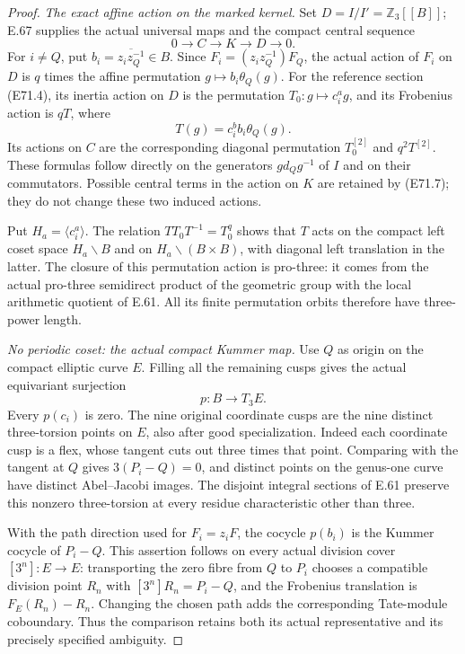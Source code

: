\begin{proof}
\emph{The exact affine action on the marked kernel.}
Set $D=I/I'=\mathbb Z_3[[B]]$; E.67 supplies the actual
universal maps and the compact central sequence
\[
                  0\longrightarrow C\longrightarrow K
                         \longrightarrow D\longrightarrow0.
 \tag{E71.7}
\]
For $i\ne Q$, put
$b_i=\overline{z_i z_Q^{-1}}\in B$.
Since $F_i=(z_i z_Q^{-1})F_Q$, the actual action of
$F_i$ on $D$ is $q$ times the affine permutation
$g\mapsto b_i\theta_Q(g)$.
For the reference section (E71.4), its inertia action
on $D$ is the permutation $T_0:g\mapsto c_i^a g$, and
its Frobenius action is $qT$, where
\[
               T(g)=c_i^b b_i\theta_Q(g).
 \tag{E71.8}
\]
Its actions on $C$ are the corresponding diagonal
permutation $T_0^{[2]}$ and $q^2T^{[2]}$.
These formulas follow directly on the generators
$g d_Qg^{-1}$ of $I$ and on their commutators.
Possible central terms in the action on $K$ are
retained by (E71.7); they do not change these two
induced actions.

Put $H_a=\langle c_i^a\rangle$. The relation
$T T_0T^{-1}=T_0^q$ shows that $T$ acts on the compact
left coset space $H_a\backslash B$ and on
$H_a\backslash(B\times B)$, with diagonal left
translation in the latter. The closure of this
permutation action is pro-three: it comes from the
actual pro-three semidirect product of the geometric
group with the local arithmetic quotient of E.61.
All its finite permutation orbits therefore have
three-power length.

\emph{No periodic coset: the actual compact Kummer map.}
Use $Q$ as origin on the compact elliptic curve $E$.
Filling all the remaining cusps gives the actual
equivariant surjection
\[
                 p:B\longrightarrow T_3E .
 \tag{E71.9}
\]
Every $p(c_i)$ is zero. The nine original coordinate
cusps are the nine distinct three-torsion points on
$E$, also after good specialization. Indeed each
coordinate cusp is a flex, whose tangent cuts out
three times that point. Comparing with the tangent
at $Q$ gives $3(P_i-Q)=0$, and distinct points on
the genus-one curve have distinct Abel--Jacobi images.
The disjoint integral sections of E.61 preserve this
nonzero three-torsion at every residue characteristic
other than three.

With the path direction used for $F_i=z_iF$, the
cocycle $p(b_i)$ is the Kummer cocycle of $P_i-Q$.
This assertion follows on every actual division
cover $[3^n]:E\to E$: transporting the zero fibre
from $Q$ to $P_i$ chooses a compatible division point
$R_n$ with $[3^n]R_n=P_i-Q$, and the Frobenius
translation is $F_E(R_n)-R_n$. Changing the chosen
path adds the corresponding Tate-module coboundary.
Thus the comparison retains both its actual
representative and its precisely specified ambiguity.


\end{proof}
